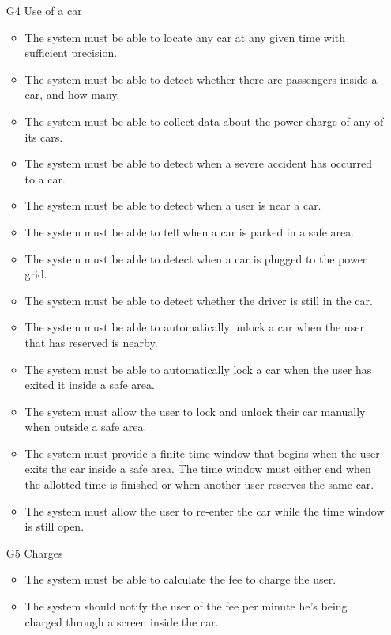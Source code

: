 \begin{itemize}
				\item [G4] Use of a car %
					\begin{itemize}
						\item The system must be able to locate any car at any given time with sufficient precision. %
						\item The system must be able to detect whether there are passengers inside a car, and how many.
						\item The system must be able to collect data about the power charge of any of its cars.
						\item The system must be able to detect when a severe accident has occurred to a car. %
						\item The system must be able to detect when a user is near a car. %
						\item The system must be able to tell when a car is parked in a safe area.
						\item The system must be able to detect when a car is plugged to the power grid.
						\item The system must be able to detect whether the driver is still in the car.
						\item The system must be able to automatically unlock a car when the user that has reserved is nearby. %
						\item The system must be able to automatically lock a car when the user has exited it inside a safe area. 
						\item The system must allow the user to lock and unlock their car manually when outside a safe area.
						\item The system must provide a finite time window that begins when the user exits the car inside a safe area. The time window must either end when the allotted time is finished or when another user reserves the same car.
						\item The system must allow the user to re-enter the car while the time window is still open. 
					\end{itemize}
					
				\item [G5] Charges %
					\begin{itemize}
						\item The system must be able to calculate the fee to charge the user.
						\item The system should notify the user of the fee per minute he's being charged through a screen inside the car.
					\end{itemize}
				

\end{itemize}

